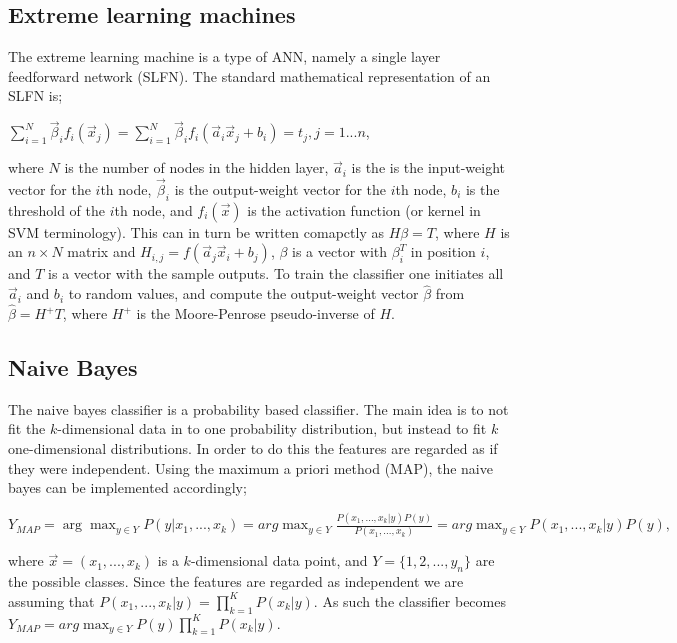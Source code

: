 \documentclass{article}
\begin{document}
\subsection{Extreme learning machines}
The extreme learning machine is a type of ANN, namely a single layer feedforward network (SLFN). The standard mathematical representation of an SLFN is;
\begin{center}
$\sum\limits_{i = 1}^N \vec{\beta}_i f_i (\vec{x}_j)  = \sum\limits_{i = 1}^N \vec{\beta}_i f_i (\vec{a}_i  \vec{x}_j + b_i)= t_j, j = 1...n$, 
\end{center}
where $N$ is the number of nodes in the hidden layer, $\vec{a}_i$ is the is the input-weight vector for the $i$th node, $\vec{\beta}_i$ is the output-weight vector for the $i$th node, $b_i$ is the threshold of the $i$th node, and $f_i(\vec{x})$ is the activation function (or kernel in SVM terminology). This can in turn be written comapctly as $H\beta = T$, where $H$ is an $n \times N$ matrix and $H_{i, j} = f(\vec{a}_j\vec{x}_i + b_j)$, $\beta$ is a vector with $\beta_i^T$ in position $i$, and $T$ is a vector with the sample outputs. To train the classifier one initiates all $\vec{a}_i$ and $b_i$ to random values, and compute the output-weight vector $\hat{\beta}$ from $\hat\beta = H^+ T$, where $H^+$ is the Moore-Penrose pseudo-inverse of $H$.

\subsection{Naive Bayes}
The naive bayes classifier is a probability based classifier. The main idea is to not fit the $k$-dimensional data in to one probability distribution, but instead to fit $k$ one-dimensional distributions. In order to do this the features are regarded as if they were independent. Using the maximum a priori method (MAP), the naive bayes can be implemented accordingly;
\begin{center}
$Y_{MAP} = \arg \max_{y \in Y} P(y | x_1, ..., x_k) = arg \max_{y \in Y} \frac{ P( x_1, ..., x_k | y)P(y) }{P(x_1, ..., x_k)} = arg \max_{y \in Y} P(x_1, ..., x_k|y)P(y) ,$
\end{center}
where $\vec{x} = (x_1, ..., x_k)$ is a $k$-dimensional data point, and $Y = \{1, 2, ...,y_n\}$ are the possible classes. Since the features are regarded as independent we are assuming that $P(x_1, ..., x_k| y) = \prod_{k=1}^{K} P(x_k |y).$ As such the classifier becomes $Y_{MAP} = arg \max_{y \in Y} P(y)\prod_{k=1}^{K}P(x_k|y)$.
\end{document}
